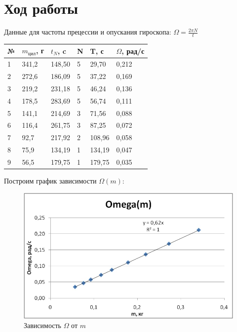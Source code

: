 \documentclass[a4paper,14pt]{extarticle}
\begin{document}
	\section{Ход работы}
	Данные для частоты прецессии и опускания гироскопа: $\Omega=\frac{2\pi N}{t}$
	
	\begin{table}[!ht]
		\centering
		\begin{tabular}{|l|l|l|l|l|l|}
			\hline
			№ & $m_\text{цил}$, г & $t_N$, c & N & T, с & $\Omega$, рад/с  \\ \hline
			1 & 341,2 & 148,50 & 5 & 29,70 & 0,212 \\ \hline
			2 & 272,6 & 186,09 & 5 & 37,22 & 0,169 \\ \hline
			3 & 219,2 & 231,18 & 5 & 46,24 & 0,136 \\ \hline
			4 & 178,5 & 283,69 & 5 & 56,74 & 0,111 \\ \hline
			5 & 141,1 & 214,69 & 3 & 71,56 & 0,088 \\ \hline
			6 & 116,4 & 261,75 & 3 & 87,25 & 0,072 \\ \hline
			7 & 92,7 & 217,92 & 2 & 108,96 & 0,058 \\ \hline
			8 & 75,9 & 134,19 & 1 & 134,19 & 0,047 \\ \hline
			9 & 56,5 & 179,75 & 1 & 179,75 & 0,035 \\ \hline
		\end{tabular}
	\end{table}
	
	Построим график зависимости $\Omega(m)$:
	
	\begin{figure}[h!]
		\centering
		\includegraphics[scale=0.75]{graph1}
		\caption{Зависимость $ \Omega $ от $ m $}
		\label{graph}
	\end{figure}
    
\end{document}
